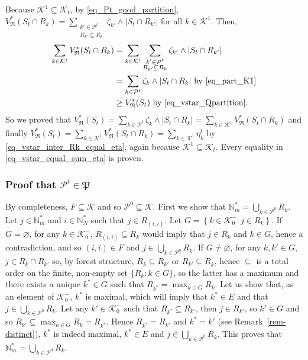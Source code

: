 \documentclass[
  11pt,
  a4paper,
]{article}
\theoremstyle{plain}
\theoremstyle{definition}
\theoremstyle{plain}
\theoremstyle{definition}
\theoremstyle{plain}
\theoremstyle{remark}
\begin{document}
Because \(\mathcal{K}^1\subseteq\mathcal{K}_t\), by
\eqref{eq_Pt_good_partition},
\(V^*_{\mathfrak{R}}(S_t\cap R_k) = \sum_{\substack{k'\in \mathcal{P}^t\\ R_{k'}\subseteq R_k}} \zeta_{k'}\wedge|S_t \cap R_{k'}|\)
for all \(k\in\mathcal{K}^1\). Then, \begin{align*}
 \sum_{k\in\mathcal{K}^1} V^*_{\mathfrak{R}}(S_t\cap R_k)&=  \sum_{k\in\mathcal{K}^1}\sum_{\substack{k'\in \mathcal{P}^t\\ R_{k'}\subseteq R_k}} \zeta_{k'}\wedge|S_t \cap R_{k'}|\\
 &=\sum_{k\in\mathcal{P}^t} \zeta_{k}\wedge |S_t\cap R_{k}| \text{ by \eqref{eq_part_K1}}\\
 &\geq V^*_{\mathfrak{R}}(S_t) \text{ by \eqref{eq_vstar_Qpartition}}.\\
\end{align*} So we proved that
\(V^*_{\mathfrak{R}}(S_t)= \sum_{k\in\mathcal{P}^t} \zeta_{k}\wedge |S_t\cap R_{k}|= \sum_{k\in\mathcal{K}^1} V^*_{\mathfrak{R}}(S_t\cap R_k)\)
and finally
\(V^*_{\mathfrak{R}}(S_t)=\sum_{k\in\mathcal{K}^1} V^*_{\mathfrak{R}}(S_t\cap R_k)= \sum_{k\in\mathcal{K}^1}  \eta_k^t\)
by \eqref{eq_vstar_inter_Rk_equal_eta}, again because
\(\mathcal{K}^1\subseteq\mathcal{K}_t\). Every equality in
\eqref{eq_vstar_equal_sum_eta} is proven.

\subsubsection{\texorpdfstring{Proof that
\(\mathcal{P}^t\in\mathfrak P\)}{Proof that \textbackslash mathcal\{P\}\^{}t\textbackslash in\textbackslash mathfrak P}}\label{proof-that-mathcalptinmathfrak-p}

By completeness, \(F\subseteq \mathcal{K}\) and so
\(\mathcal{P}^0\subseteq \mathcal{K}\). First we show that
\(\mathbb{N}_m^*=\bigcup_{k\in\mathcal{P}^0}R_k\). Let
\(j\in\mathbb{N}_m^*\) and \(i\in \mathbb{N}_N^*\) such that
\(j\in R_{(i,i)}\). Let
\(G=\left\{k\in\mathcal{K}_0^-: j\in R_k\right\}\). If
\(G=\varnothing\), for any \(k\in\mathcal{K}_0^-\),
\(R_{(i,i)}\subseteq R_k\) would imply that \(j\in R_k\) and \(k\in G\),
hence a contradiction, and so \((i,i)\in F\) and
\(j\in \bigcup_{k\in\mathcal{P}^0}R_k\). If \(G\neq\varnothing\), for
any \(k,k'\in G\), \(j\in R_{k}\cap R_{k'}\) so, by forest structure,
\(R_{k}\subseteq R_{k'}\) or \(R_{k'}\subseteq R_{k}\), hence
\(\subseteq\) is a total order on the finite, non-empty set
\(\{R_k : k\in G\}\), so the latter has a maximum and there exists a
unique \(k^*\in G\) such that \(R_{k^*}=\max_{k\in G}R_k\). Let us show
that, as an element of \(\mathcal{K}_0^-\), \(k^*\) is maximal, which
will imply that \(k^*\in E\) and that
\(j\in \bigcup_{k\in\mathcal{P}^0}R_k\). Let any
\(k'\in \mathcal{K}_0^-\) such that \(R_{k^*}\subseteq R_{k'}\), then
\(j\in R_{k'}\), so \(k'\in G\) and so
\(R_{k'}\subseteq \max_{k\in G}R_k=R_{k^*}\). Hence \(R_{k^*}= R_{k'}\)
and \(k^*=k'\) (see Remark~\ref{rem-distinct}), \(k^*\) is indeed
maximal, \(k^*\in E\) and \(j\in \bigcup_{k\in\mathcal{P}^0}R_k\). This
proves that \(\mathbb{N}_m^*=\bigcup_{k\in\mathcal{P}^0}R_k\).
\end{document}
